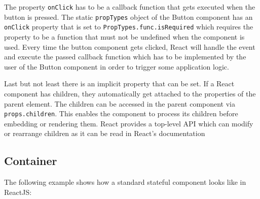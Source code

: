 The property \texttt{onClick} has to be a callback function that gets executed when the button is pressed. The static \texttt{propTypes} object of the Button component has an \texttt{onClick} property that is set to \texttt{PropTypes.func.isRequired} which requires the property to be a function that must not be undefined when the component is used. Every time the button component gets clicked, React will handle the event and execute the passed callback function which has to be implemented by the user of the Button component in order to trigger some application logic.

Last but not least there is an implicit property that can be set. If a React component has children, they automatically get attached to the properties of the parent element. The children can be accessed in the parent component via \texttt{props.children}. This enables the component to process its children before embedding or rendering them. React provides a top-level API which can modify or rearrange children as it can be read in React's documentation \cite[React]{FacebookInc.2013}

\subsection{Container}

The following example shows how a standard stateful component looks like in ReactJS:\newline

